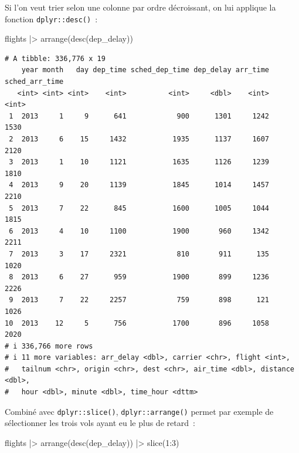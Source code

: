 \documentclass[
  letterpaper,
  DIV=11,
  numbers=noendperiod,
  oneside]{scrreprt}
\newenvironment{Shaded}{\begin{snugshade}}{\end{snugshade}}
\newcommand{\DecValTok}[1]{\textcolor[rgb]{0.68,0.00,0.00}{#1}}
\newcommand{\FunctionTok}[1]{\textcolor[rgb]{0.28,0.35,0.67}{#1}}
\newcommand{\NormalTok}[1]{\textcolor[rgb]{0.00,0.23,0.31}{#1}}
\newcommand{\SpecialCharTok}[1]{\textcolor[rgb]{0.37,0.37,0.37}{#1}}
\begin{document}
Si l'on veut trier selon une colonne par ordre décroissant, on lui
applique la fonction \texttt{dplyr::desc()}~:

\begin{Shaded}
\begin{Highlighting}[]
\NormalTok{flights }\SpecialCharTok{|\textgreater{}} 
  \FunctionTok{arrange}\NormalTok{(}\FunctionTok{desc}\NormalTok{(dep\_delay))}
\end{Highlighting}
\end{Shaded}

\begin{verbatim}
# A tibble: 336,776 x 19
    year month   day dep_time sched_dep_time dep_delay arr_time sched_arr_time
   <int> <int> <int>    <int>          <int>     <dbl>    <int>          <int>
 1  2013     1     9      641            900      1301     1242           1530
 2  2013     6    15     1432           1935      1137     1607           2120
 3  2013     1    10     1121           1635      1126     1239           1810
 4  2013     9    20     1139           1845      1014     1457           2210
 5  2013     7    22      845           1600      1005     1044           1815
 6  2013     4    10     1100           1900       960     1342           2211
 7  2013     3    17     2321            810       911      135           1020
 8  2013     6    27      959           1900       899     1236           2226
 9  2013     7    22     2257            759       898      121           1026
10  2013    12     5      756           1700       896     1058           2020
# i 336,766 more rows
# i 11 more variables: arr_delay <dbl>, carrier <chr>, flight <int>,
#   tailnum <chr>, origin <chr>, dest <chr>, air_time <dbl>, distance <dbl>,
#   hour <dbl>, minute <dbl>, time_hour <dttm>
\end{verbatim}

Combiné avec \texttt{dplyr::slice()}, \texttt{dplyr::arrange()} permet
par exemple de sélectionner les trois vols ayant eu le plus de retard~:

\begin{Shaded}
\begin{Highlighting}[]
\NormalTok{flights }\SpecialCharTok{|\textgreater{}} 
  \FunctionTok{arrange}\NormalTok{(}\FunctionTok{desc}\NormalTok{(dep\_delay)) }\SpecialCharTok{|\textgreater{}} 
  \FunctionTok{slice}\NormalTok{(}\DecValTok{1}\SpecialCharTok{:}\DecValTok{3}\NormalTok{)}
\end{Highlighting}
\end{Shaded}
\end{document}
